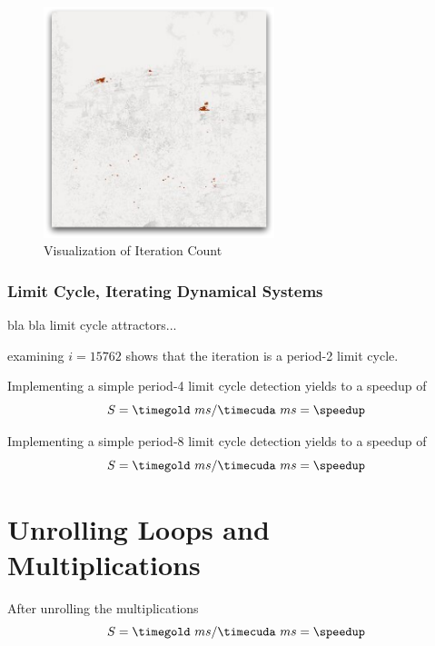 \begin{figure}[ht]
\centering
\includegraphics[width=0.6\textwidth]{gfx/itr_limitcycle0.pdf}
\caption{Visualization of Iteration Count}
\label{fig:vis_iteration_count}
\end{figure}



\subsubsection{Limit Cycle, Iterating Dynamical Systems} %
\label{ssub:limit_cycle_iterating_dynamical_systems}
bla bla  limit cycle attractors...


examining $i = 15762$ shows that the iteration is a period-2 limit cycle.

Implementing a simple period-4 limit cycle detection yields to a speedup of
\fpDiv{\speedup}{\timegold}{\timecuda}
\begin{equation*}\label{eq:speedup9}
	S = \timegold\ ms/\timecuda\ ms = \speedup
\end{equation*}

Implementing a simple period-8 limit cycle detection yields to a speedup of
\fpDiv{\speedup}{\timegold}{\timecuda}
\begin{equation*}\label{eq:speedup10}
	S = \timegold\ ms/\timecuda\ ms = \speedup
\end{equation*}


\section{Unrolling Loops and Multiplications} %
\label{sec:unrolling_loops_and_multiplications}

After unrolling the multiplications 
\fpDiv{\speedup}{\timegold}{\timecuda}
\begin{equation*}\label{eq:speedup11}
	S = \timegold\ ms/\timecuda\ ms = \speedup
\end{equation*}




